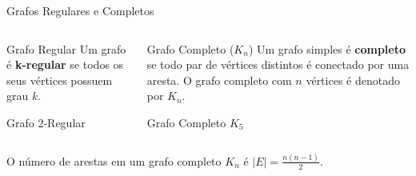 \documentclass[xcolor=table]{beamer}
\begin{document}
\begin{frame}{Grafos Regulares e Completos}
  \begin{columns}[T]
    \begin{block}{Grafo Regular}
      \centering
      Um grafo é \textbf{k-regular} se todos os seus vértices possuem grau $k$.\par
      \vspace{.4em}
      \par
      {\tiny Grafo 2-Regular}
    \end{block}
    \begin{block}{Grafo Completo ($K_n$)}
      \centering
      Um grafo simples é \textbf{completo} se todo par de vértices distintos é conectado por uma aresta. O grafo completo com $n$ vértices é denotado por $K_n$.\par
      \vspace{.3em}
      \par
      {\tiny Grafo Completo $K_5$}
    \end{block}
  \end{columns}
  \begin{theorem}
    O número de arestas em um grafo completo $K_n$ é $|E| = \frac{n(n-1)}{2}$.
  \end{theorem}
\end{frame}
\end{document}
